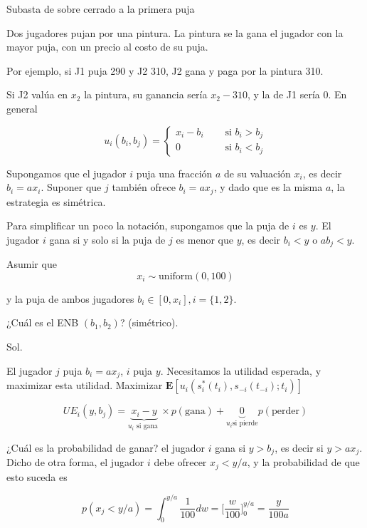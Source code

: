 \documentclass[12pt]{article}
\begin{document}
\begin{exbox}{Subasta de sobre cerrado a la primera puja}

	Dos jugadores pujan por una pintura. La pintura se la gana el jugador con la mayor puja, con un precio al costo de su puja.

	Por ejemplo, si J1 puja 290 y J2 310, J2 gana y paga por la pintura 310.

	Si J2 valúa en $x_2$ la pintura, su ganancia sería $x_2 - 310$, y la de J1 sería 0. En general

	\[
		u_i(b_i, b_j)=\begin{cases}
			x_i - b_i\quad & \text{ si } b_i > b_j \\
			0 \quad        & \text{ si } b_i < b_j
		\end{cases}
	\]

	Supongamos que el jugador $i$ puja una fracción $a$ de su valuación $x_i$, es decir $b_i = ax_i$. Suponer que $j$ también ofrece $b_i = a x_j$, y dado que es la misma $a$, la estrategia es simétrica.

	Para simplificar un poco la notación, supongamos que la puja de $i$ es $y$. El jugador $i$ gana si y solo si la puja de $j$ es menor que $y$, es decir $b_i<y$ o $ab_j<y$.

	Asumir que
	$$
		x_i \sim \text{uniform}(0, 100)
	$$

	y la puja de ambos jugadores $b_i \in [0, x_i], i= \{1, 2\}$.

	¿Cuál es el ENB $(b_1, b_2)$? (simétrico).

	Sol.

	El jugador $j$ puja $b_i = ax_j$, $i$ puja $y$. Necesitamos la utilidad esperada, y maximizar esta utilidad. Maximizar $\textbf{E}[u_i(s_i^*(t_i), s_{-i}(t_{-i}); t_i)]$

	\[
		UE_i(y, b_j) = \underbrace{x_i-y}_{u_i\text{ si gana }} \times p(\text{gana}) + \underbrace{0}_{u_i\text{si pierde}} p(\text{perder})
	\]

	¿Cuál es la probabilidad de ganar? el jugador $i$ gana si $y>b_j$, es decir si $y>ax_j$. Dicho de otra forma, el jugador $i$ debe ofrecer $x_j < y/a$, y la probabilidad de que esto suceda es

	\[
		p(x_j < y/a) = \int_0^{y/a} \frac{1}{100}dw = \Bigg[\frac{w}{100} \Bigg]_0^{y/a} = \frac{y}{100a} \]

	\begin{center}
	\end{center}


\end{exbox}
\end{document}
